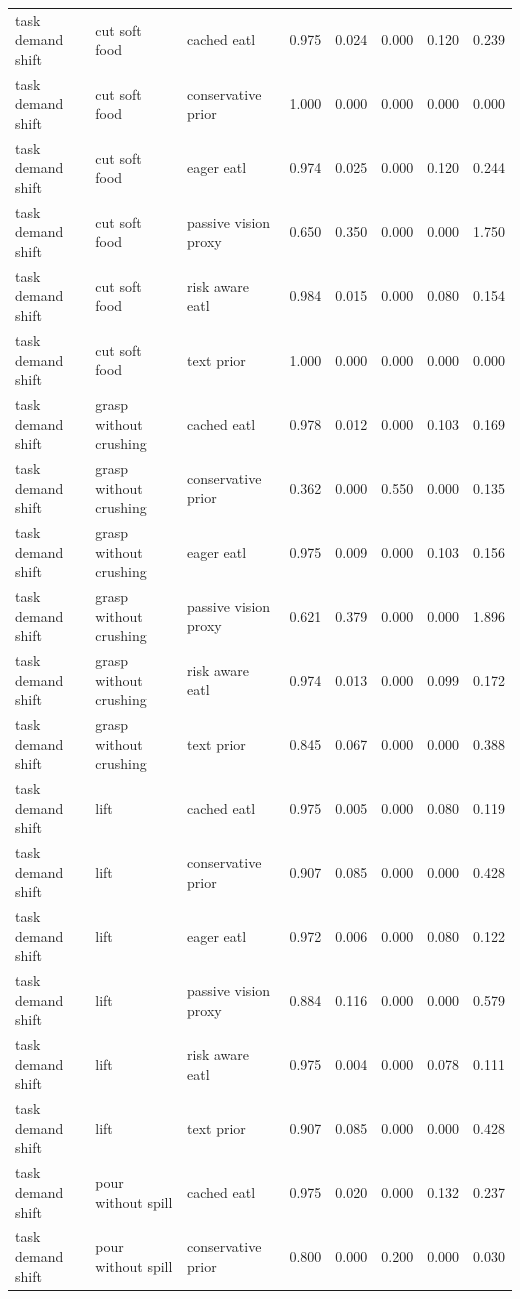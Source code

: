\begin{longtable}{lllrrrrr}
\midrule
task demand shift & cut soft food & cached eatl & 0.975 & 0.024 & 0.000 & 0.120 & 0.239 \\
task demand shift & cut soft food & conservative prior & 1.000 & 0.000 & 0.000 & 0.000 & 0.000 \\
task demand shift & cut soft food & eager eatl & 0.974 & 0.025 & 0.000 & 0.120 & 0.244 \\
task demand shift & cut soft food & passive vision proxy & 0.650 & 0.350 & 0.000 & 0.000 & 1.750 \\
task demand shift & cut soft food & risk aware eatl & 0.984 & 0.015 & 0.000 & 0.080 & 0.154 \\
task demand shift & cut soft food & text prior & 1.000 & 0.000 & 0.000 & 0.000 & 0.000 \\
\midrule
task demand shift & grasp without crushing & cached eatl & 0.978 & 0.012 & 0.000 & 0.103 & 0.169 \\
task demand shift & grasp without crushing & conservative prior & 0.362 & 0.000 & 0.550 & 0.000 & 0.135 \\
task demand shift & grasp without crushing & eager eatl & 0.975 & 0.009 & 0.000 & 0.103 & 0.156 \\
task demand shift & grasp without crushing & passive vision proxy & 0.621 & 0.379 & 0.000 & 0.000 & 1.896 \\
task demand shift & grasp without crushing & risk aware eatl & 0.974 & 0.013 & 0.000 & 0.099 & 0.172 \\
task demand shift & grasp without crushing & text prior & 0.845 & 0.067 & 0.000 & 0.000 & 0.388 \\
\midrule
task demand shift & lift & cached eatl & 0.975 & 0.005 & 0.000 & 0.080 & 0.119 \\
task demand shift & lift & conservative prior & 0.907 & 0.085 & 0.000 & 0.000 & 0.428 \\
task demand shift & lift & eager eatl & 0.972 & 0.006 & 0.000 & 0.080 & 0.122 \\
task demand shift & lift & passive vision proxy & 0.884 & 0.116 & 0.000 & 0.000 & 0.579 \\
task demand shift & lift & risk aware eatl & 0.975 & 0.004 & 0.000 & 0.078 & 0.111 \\
task demand shift & lift & text prior & 0.907 & 0.085 & 0.000 & 0.000 & 0.428 \\
\midrule
task demand shift & pour without spill & cached eatl & 0.975 & 0.020 & 0.000 & 0.132 & 0.237 \\
task demand shift & pour without spill & conservative prior & 0.800 & 0.000 & 0.200 & 0.000 & 0.030 \\

\end{longtable}
